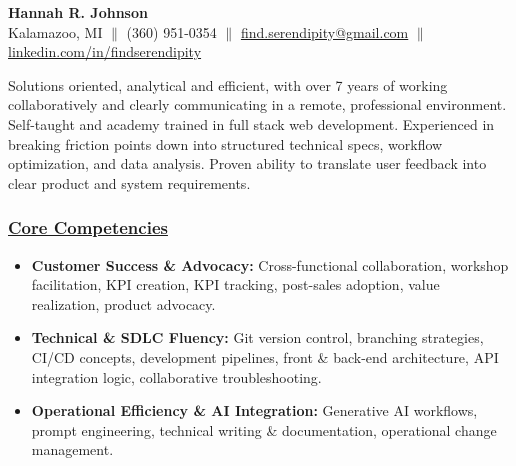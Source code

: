 \documentclass[a4paper,10pt]{article}
\begin{document}
\begin{center}
      {\LARGE \textbf{Hannah R. Johnson}} \\
            Kalamazoo, MI  $\parallel$  (360) 951-0354 $\parallel$  \href{mailto:find.serendipity@gmail.com}{find.serendipity@gmail.com} $\parallel$  \href{https://www.linkedin.com/in/findserendipity/}{linkedin.com/in/findserendipity} 
\end{center}

\vspace{4mm}
Solutions oriented, analytical and efficient, with over 7 years of working collaboratively and clearly communicating in a remote, professional environment. Self-taught and academy trained in full stack web development. Experienced in breaking friction points down into structured technical specs, workflow optimization, and data analysis. Proven ability to translate user feedback into clear product and system requirements.
\vspace{2mm}

\subsubsection{\underline{Core Competencies}}
\begin{itemize}
    \item \textbf{Customer Success \& Advocacy:} Cross-functional collaboration, workshop facilitation, KPI creation, KPI tracking, post-sales adoption, value realization, product advocacy.
    \item \textbf{Technical \& SDLC Fluency:} Git version control, branching strategies, CI/CD concepts, development pipelines, front \& back-end architecture, API integration logic, collaborative troubleshooting.
    \item \textbf{Operational Efficiency \& AI Integration:} Generative AI workflows, prompt engineering, technical writing \& documentation, operational change management.
\end{itemize}
\end{document}
